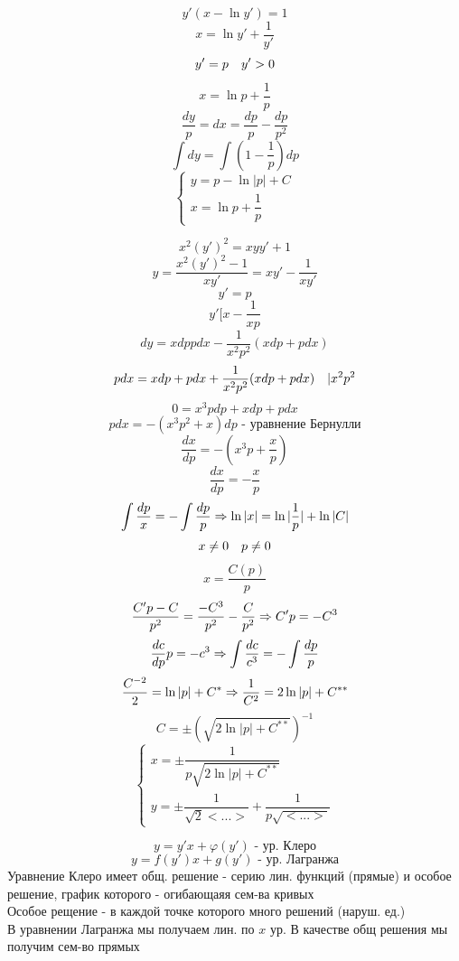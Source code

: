 \documentclass[12pt, fleqn]{article}
\begin{document}
\begin{Example}[267-286]
  \[y'(x-\ln y') = 1\]
  \[x = \ln y' + \dfrac{1}{y'}\]
  \[y' = p \quad y' > 0\]
  \[x = \ln p + \dfrac{1}{p}\]
  \[\dfrac{dy}{p} = dx = \dfrac{dp}{p} - \dfrac{dp}{p^2}\]
  \[\int dy = \int (1-\dfrac{1}{p}) dp\]
  \[\begin{cases}
    y = p - \ln |p| + C\\
    x = \ln p + \dfrac{1}{p}
  \end{cases}\]
\end{Example}

\begin{Example}[280]
  \[x^2 (y')^2 = xyy' + 1\]
  \[y = \dfrac{x^2 (y')^2 - 1}{x y'} = xy' - \dfrac{1}{xy'}\]
  \[y' = p\]
  \[y ' [x - \dfrac{1}{xp}\]
  \[dy = x dp p dx - \dfrac{1}{x^2 p^2} (x dp + p dx)\]
  \[p dx = x dp + p dx + \dfrac{1}{x^2 p^2} (x dp + p dx)\quad | x^2 p^2\]
  \[0 = x^3 p dp + x dp + p dx\]
  \[p dx = -(x^3 p^2 + x) dp \text{ - уравнение Бернулли}\]
  \[\dfrac{dx}{dp} = -(x^3 p + \dfrac{x}{p})\]
  \[\dfrac{dx}{dp} = - \dfrac{x}{p}\]
  \[\int \dfrac{dp}{x} = - \int \dfrac{dp}{p} \Rightarrow \ln |x| = \ln |\dfrac{1}{p}| + \ln|C|\]
  \[x \neq 0 \quad p \neq 0\]
  \[x = \dfrac{C(p)}{p}\]
  \[\dfrac{C'p - C}{p^2} = \dfrac{-C^3}{p^2} - \dfrac{C}{p^2} \Rightarrow C'p = - C^3\]
  \[\dfrac{dc}{dp} p = - c^3 \Rightarrow \int \dfrac{dc}{c^3} = - \int \dfrac{dp}{p}\]
  \[\dfrac{C^{-2}}{2} = \ln|p| + C^* \Rightarrow \dfrac{1}{C^2} = 2 \ln|p| + C^{**}\]
  \[C = \pm (\sqrt{2 \ln|p| + C^{**}})^{-1} \]
  \[\begin{cases}
    x = \pm \dfrac{1}{p\sqrt{2 \ln|p| + C^{**}}}\\
    y = \pm \dfrac{1}{\sqrt 2 <...>} + \dfrac{1}{p \sqrt{<...>}}
  \end{cases}\]
\end{Example}


\begin{Definition}
    \[y = y' x + \varphi(y') \text{ - ур. Клеро}\]
    \[y = f(y')x + g(y') \text{ - ур. Лагранжа}\]
    Уравнение Клеро имеет общ. решение - серию лин. функций (прямые) и особое решение, график которого -
    огибающаяя сем-ва кривых\\
    Особое рещение - в каждой точке которого много решений (наруш. ед.)\\
    В уравнении Лагранжа мы получаем лин. по $x$ ур. В качестве общ решения мы получим сем-во прямых
\end{Definition}
\end{document}
